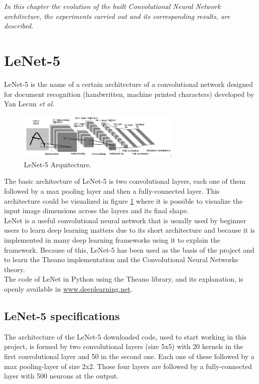 \begin{small}
\emph{In this chapter the evolution of the built Convolutional Neural Network architecture, the experiments carried out and its corresponding results, are described.}
\end{small}

\section{LeNet-5}
LeNet-5 \cite{Lenet5} is the name of a certain architecture of a convolutional network designed for document recognition (handwritten, machine printed characters) developed by Yan Lecun \textit{et al}.\\

\begin{figure}[htb]
  \centering
  \includegraphics[width=0.7\textwidth]{images/images_lenet/LenetArquitectura.png}
  \caption{LeNet-5 Arquitecture.}
  \label{Lenet5Arquitectura}
\end{figure}

The basic architecture of LeNet-5 is two convolutional layers, each one of them followed by a max pooling layer and then a fully-connected layer. This architecture could be visualized in figure \ref{Lenet5Arquitectura} where it is possible to visualize the input image dimensions across the layers and its final shape.\\

LeNet is a useful convolutional neural network that is usually used by beginner users to learn deep learning matters due to its short architecture and because it is implemented in many deep learning frameworks using it to explain the framework. Because of this, LeNet-5 has been used as the basis of the project and to learn the Theano implementation and the Convolutional Neural Networks theory.\\

The code of LeNet in Python using the Theano library, and its explanation, is openly available in \url{www.deeplearning.net}.

\subsection{LeNet-5 specifications}
The architecture of the LeNet-5 downloaded code, used to start working in this project, is formed by two convolutional layers (size 5x5) with 20 kernels in the first convolutional layer and 50 in the second one. Each one of these followed by a max pooling-layer of size 2x2. Those four layers are followed by a fully-connected layer with 500 neurons at the output.\\

